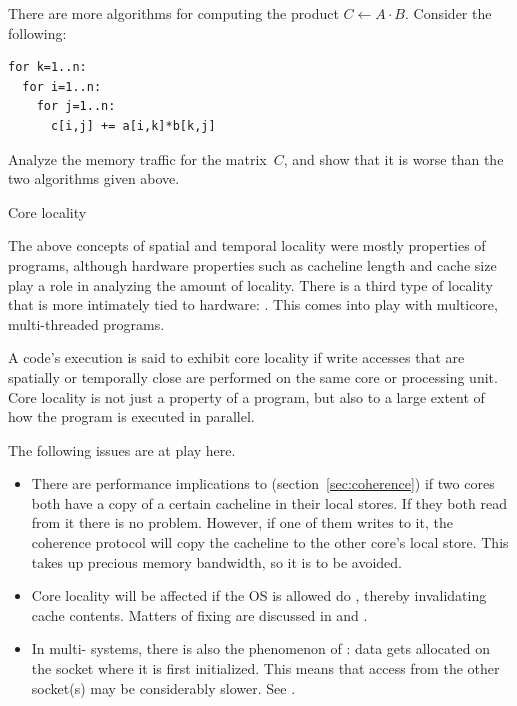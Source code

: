 \begin{exercise}
  There are more algorithms for computing the product $C\leftarrow
  A\cdot B$. Consider the following:
\begin{lstlisting}
for k=1..n:
  for i=1..n:
    for j=1..n:
      c[i,j] += a[i,k]*b[k,j]
\end{lstlisting}
Analyze the memory traffic for the matrix~$C$, and show that it is
worse than the two algorithms given above.
\end{exercise}

 {Core locality}

The above concepts of spatial and temporal locality were mostly
properties of programs, although hardware properties such as cacheline
length and cache size play a role in analyzing the amount of
locality. There is a third type of locality that is more intimately
tied to hardware: .
This comes into play with multicore, multi-threaded programs.

A code's execution is said to exhibit core locality if write accesses
that are spatially or temporally close are performed on the same core
or processing unit.
Core locality is not just a property of a program, but also to a large
extent of how the program is executed in parallel.

The following issues are at play here.
\begin{itemize}
\item
  There are performance implications to 
  (section~\ref{sec:coherence})
  if two cores both have a copy of a certain cacheline in their local stores.
  If they both read from it there is no problem. However, if one of them
  writes to it, the coherence protocol will copy the cacheline to the
  other core's local store. This takes up precious memory bandwidth, so
  it is to be avoided.
\item Core locality will be affected if the \ac{OS} is allowed do
  , thereby invalidating cache contents.
  Matters of fixing  are discussed in
   and .
\item In multi- systems, there is also the phenomenon of
  : data gets allocated on the socket where
  it is first initialized.
  This means that access from the other socket(s) may be considerably slower.
  See .
\end{itemize}

